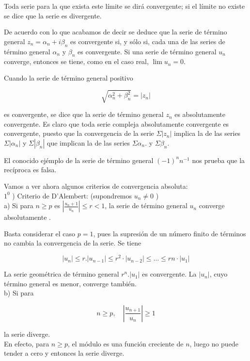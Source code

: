 \documentclass[10pt]{article}
\theoremstyle{plain}
\theoremstyle{definition}
\theoremstyle{remark}
\begin{document}
Toda serie para la que exista este límite se dirá convergente; si el límite no existe se dice que la serie es divergente.

De acuerdo con lo que acabamos de decir se deduce que la serie de término general $z_{n}=\alpha_{n}+i \beta_{n}$ es convergente si, y sólo si, cada una de las series de término general $\alpha_{n}$ y $\beta_{n}$ es convergente. Si una serie de término general $u_{n}$ converge, entonces se tiene, como en el caso real, $\lim u_{n}=0$.

Cuando la serie de término general positivo

$$
\sqrt{\alpha_{n}^{2}+\beta_{n}^{2}}=\left|z_{n}\right|
$$

es convergente, se dice que la serie de término general $z_{n}$ es absolutamente convergente. Es claro que toda serie compleja absolutamente convergente es convergente, puesto que la convergencia de la serie $\Sigma\left|z_{n}\right|$ implica la de las series $\Sigma\left|\alpha_{n}\right|$ y $\Sigma\left|\beta_{n}\right|$ que implican la de las series $\Sigma \alpha_{n}$. y $\Sigma \beta_{n}$.

El conocido ejémplo de la serie de término general $(-1)^{n} n^{-1}$ nos prueba que la recíproca es falsa.

Vamos a ver ahora algunos criterios de convergencia absoluta:\\
$1^{0}$ ) Criterio de D'Alembert: (supondremos $u_{n} \neq 0$ )\\
a) Si para $n \geqslant p$ es $\left|\frac{u_{n}+1}{u_{n}}\right| \leqslant r<1$, la serie de término general $u_{n}$ converge absolutamente .

Basta considerar el caso $p=1$, pues la supresión de un número finito de términos no cambia la convergencia de la serie. Se tiene

$$
\left|u_{n}\right| \leqslant r .\left|u_{n-1}\right| \leqslant r^{2} \cdot\left|u_{n-2}\right| \leqslant \ldots \leqslant r n \cdot\left|u_{1}\right|
$$

La serie geométrica de término general $r^{n} .\left|u_{1}\right|$ es convergente. La $\left|u_{n}\right|$, cuyo término general es menor, converge también.\\
b) Si para

$$
n \geqslant p, \quad\left|\frac{u_{n+1}}{u_{n}}\right| \geqslant 1
$$

la serie diverge.\\
En efecto, para $n \geqslant p$, el módulo es una función creciente de $n$, luego no puede tender a cero y entonces la serie diverge.
\end{document}
